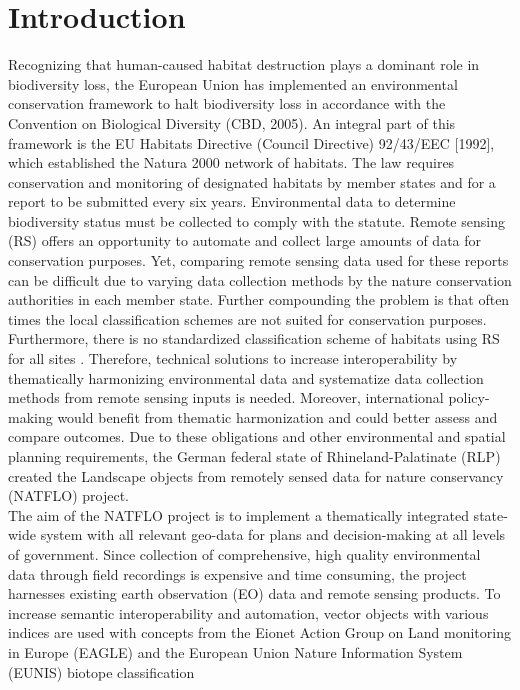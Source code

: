 \documentclass[authoryear, review,12pt,number]{elsarticle}
\begin{document}
\section{Introduction} 
Recognizing that human-caused habitat destruction plays a dominant role in
biodiversity loss, the European Union has implemented an environmental
conservation framework to halt biodiversity loss in accordance with the
Convention on Biological Diversity (CBD, 2005). An integral part of this
framework is the EU Habitats Directive (Council Directive) 92/43/EEC [1992],
which established the Natura 2000 network of habitats. The law requires
conservation and monitoring of designated habitats by member states and for a
report to be submitted every six years. Environmental data 
to determine biodiversity status must be collected to comply with the 
statute. Remote sensing (RS) offers an opportunity to automate and collect large
amounts of data for conservation purposes. Yet, comparing remote sensing
data used for these reports can be difficult due to varying data collection
methods by the nature conservation authorities in each member state.
Further compounding the problem is that often times the local classification
schemes are not suited for conservation purposes. Furthermore, there is no
standardized classification scheme of habitats using RS for all sites
\citep{Lucas2015}. Therefore, technical solutions to increase interoperability
by thematically harmonizing environmental data and systematize data collection
methods from remote sensing inputs is needed.
Moreover, international policy-making would benefit from thematic harmonization
and could better assess and compare outcomes. Due to these obligations and
other environmental and spatial planning requirements, the German federal state
of Rhineland-Palatinate (RLP) created the Landscape objects
from remotely sensed data for nature conservancy (NATFLO) project.\\
The aim of the NATFLO project is to implement a
thematically integrated state-wide system with all relevant geo-data for plans
and decision-making at all levels of government.  Since collection of
comprehensive, high quality environmental data through field recordings is
expensive and time consuming, the project harnesses existing earth observation
(EO) data and remote sensing products. To increase semantic
interoperability and automation, vector objects with various indices are used
with concepts from the Eionet Action Group on Land monitoring in Europe (EAGLE)
and the European Union Nature Information System (EUNIS) biotope classification
\end{document}
